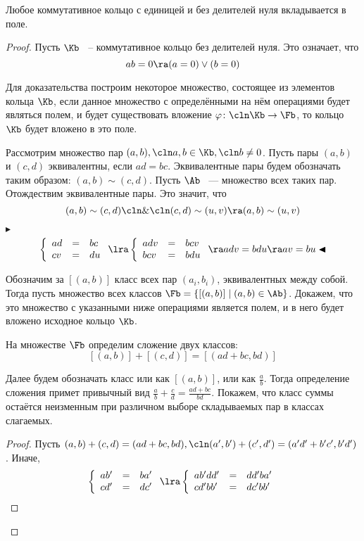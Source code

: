 \begin{theorem}
\label{group:pole}
Любое коммутативное кольцо с единицей и без делителей нуля вкладывается в поле.
\end{theorem}
\begin{proof}
Пусть $\Kb$ ~-- коммутативное кольцо без делителей нуля. Это означает, что
$$ab=0\ra (a=0)\vee(b=0)$$

Для доказательства построим некоторое множество, состоящее из элементов кольца $\Kb$, если данное множество с определёнными на нём операциями будет являться полем, и будет существовать вложение $\varphi\colon\cln\Kb\rightarrow \Fb$, то кольцо $\Kb$ будет вложено в это поле.

Рассмотрим множество пар $(a,b),\cln a,b\in\Kb,\cln b\ne0$. Пусть пары $(a,b)$ и $(c,d)$ эквивалентны, если $ad=bc$. Эквивалентные пары будем обозначать таким образом: $(a,b)\sim(c,d)$. Пусть $\Ab$ ~--- множество всех таких пар. Отождествим эквивалентные пары. Это значит, что $$(a,b)\sim(c,d)\cln\&\cln(c,d)\sim(u,v)\ra(a,b)\sim(u,v)$$

$\blacktriangleright$
$$
\left\{
\begin{array}{lll}
ad&=&bc\\
cv&=&du
\end{array}
\right.
\lra
\left\{
\begin{array}{lll}
adv&=&bcv\\
bcv&=&bdu
\end{array}
\right.
\ra adv=bdu \ra av=bu \blacktriangleleft
$$

Обозначим за $[(a,b)]$ класс всех пар $(a_i,b_i)$, эквивалентных между собой. Тогда пусть множество всех классов $\Fb=\{ [(a,b)] \mid (a,b)\in \Ab\}$. Докажем, что это множество с указанными ниже операциями является полем, и в него будет вложено исходное кольцо $\Kb$.

На множестве $\Fb$ определим сложение двух классов:
$$[(a,b)]+[(c,d)]=[(ad+bc,bd)]$$

Далее будем обозначать класс или как $[(a,b)]$, или как
$\frac{a}{b}$. Тогда определение сложения примет привычный вид
$\frac{a}{b}+\frac{c}{d}=\frac{ad+bc}{bd}$. Покажем, что класс суммы
остаётся неизменным при различном выборе складываемых пар в классах
слагаемых.


\begin{proof}
  Пусть $(a,b)+(c,d)=(ad+bc,bd),\cln(a',b')+(c',d') = (a'd'+b'c',b'd')$. Иначе,
  $$
  \left\{
  \begin{array}{lll}
    ab'&=&ba'\\
    cd'&=&dc'
  \end{array}
  \right.
  \lra
  \left\{
  \begin{array}{lll}
    ab'dd'&=&dd'ba'\\
    cd'bb'&=&dc'bb'
  \end{array}
  \right.
  $$


\end{proof}
\end{proof}

